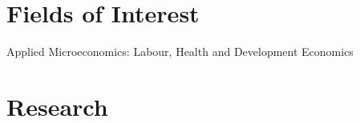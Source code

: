 \documentclass[letterpaper]{article}
\renewenvironment{itemize}{
  \begin{list}{}{
    \setlength{\leftmargin}{1.5em}
  }
}{
  \end{list}
}
\newcommand{\cvbullet}[1]{\item #1}
\begin{document}
\section*{Fields of Interest}
\begin{itemize}
	\cvbullet{Applied Microeconomics: Labour, Health and Development Economics}
\end{itemize}

\section*{Research}
\end{document}
